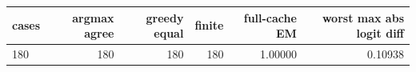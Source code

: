 \begin{tabular}{lrrrrr}
\toprule
cases & argmax agree & greedy equal & finite & full-cache EM & worst max abs logit diff \\
\midrule
180 & 180 & 180 & 180 & 1.00000 & 0.10938 \\
\bottomrule
\end{tabular}
